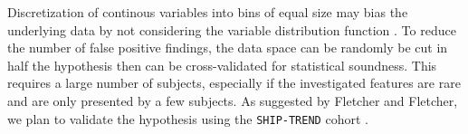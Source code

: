 \documentclass[journal]{style/vgtc} 			          %
\begin{document}
Discretization of continous variables into bins of equal size may bias the underlying data by not considering the variable distribution function \cite{Fletcher2012}.
To reduce the number of false positive findings, the data space can be randomly be cut in half the hypothesis then can be cross-validated for statistical soundness.
%
This requires a large number of subjects, especially if the investigated features are rare and are only presented by a few subjects.
%
As suggested by Fletcher and Fletcher, we plan to validate the hypothesis using the \texttt{SHIP-TREND} cohort \cite{Fletcher2012}.





\end{document}
